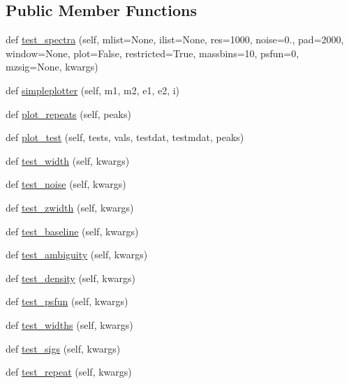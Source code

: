 \subsection*{Public Member Functions}
\begin{DoxyCompactItemize}
\item 
def \hyperlink{class_uni_dec_1_1unidec__tests_1_1_uni_dec_test_a08242f9b9df1f340dd55cc21a3badb54}{test\+\_\+spectra} (self, mlist=None, ilist=None, res=1000, noise=0., pad=2000, window=None, plot=False, restricted=True, massbins=10, psfun=0, mzsig=None, kwargs)
\item 
def \hyperlink{class_uni_dec_1_1unidec__tests_1_1_uni_dec_test_a231773da46ef137706e10cfab5aa192f}{simpleplotter} (self, m1, m2, e1, e2, i)
\item 
def \hyperlink{class_uni_dec_1_1unidec__tests_1_1_uni_dec_test_acc8105e8a101cf0c3fccbef09e178a45}{plot\+\_\+repeats} (self, peaks)
\item 
def \hyperlink{class_uni_dec_1_1unidec__tests_1_1_uni_dec_test_aa2795e1e953879c19ed7dbcdbd52a928}{plot\+\_\+test} (self, tests, vals, testdat, testmdat, peaks)
\item 
def \hyperlink{class_uni_dec_1_1unidec__tests_1_1_uni_dec_test_a3a7bc444baa2261883a289040543ad23}{test\+\_\+width} (self, kwargs)
\item 
def \hyperlink{class_uni_dec_1_1unidec__tests_1_1_uni_dec_test_a6a017fbc9b8072f208e7c46bacdf8d66}{test\+\_\+noise} (self, kwargs)
\item 
def \hyperlink{class_uni_dec_1_1unidec__tests_1_1_uni_dec_test_ae022c73aa884c79e4c17f48ac67fa3d1}{test\+\_\+zwidth} (self, kwargs)
\item 
def \hyperlink{class_uni_dec_1_1unidec__tests_1_1_uni_dec_test_adc49f889bc5a4861ddf5c4b30f661581}{test\+\_\+baseline} (self, kwargs)
\item 
def \hyperlink{class_uni_dec_1_1unidec__tests_1_1_uni_dec_test_ab578ac2a5f0a210fee631b70e3a53373}{test\+\_\+ambiguity} (self, kwargs)
\item 
def \hyperlink{class_uni_dec_1_1unidec__tests_1_1_uni_dec_test_a465e17d26a5d0f7b2efd779deb232fb4}{test\+\_\+density} (self, kwargs)
\item 
def \hyperlink{class_uni_dec_1_1unidec__tests_1_1_uni_dec_test_a661ad3a27086e8a2ac1b512a86c0f4d3}{test\+\_\+psfun} (self, kwargs)
\item 
def \hyperlink{class_uni_dec_1_1unidec__tests_1_1_uni_dec_test_a17497d7c058ecb982108ecd07eea55ac}{test\+\_\+widths} (self, kwargs)
\item 
def \hyperlink{class_uni_dec_1_1unidec__tests_1_1_uni_dec_test_a34808b3417fbfe04fd514907371c1822}{test\+\_\+sigs} (self, kwargs)
\item 
def \hyperlink{class_uni_dec_1_1unidec__tests_1_1_uni_dec_test_a80f4b1c8258f43c765d9f0832c5bac91}{test\+\_\+repeat} (self, kwargs)
\end{DoxyCompactItemize}

